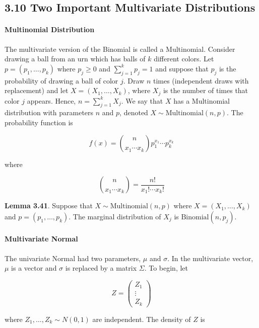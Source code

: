 \subsection*{3.10 Two Important Multivariate Distributions}\label{two-important-multivariate-distributions}

\paragraph{Multinomial Distribution}\label{multinomial-distribution}

The multivariate version of the Binomial is called a Multinomial.
Consider drawing a ball from an urn which has balls of \(k\) different
colors. Let \(p = (p_{1}, \dots, p_{k})\) where \(p_{j} \geq 0\) and
\(\sum_{j=1}^{k} p_{j} = 1\) and suppose that \(p_{j}\) is the probability of
drawing a ball of color \(j\). Draw \(n\) times (independent draws with
replacement) and let \(X = (X_{1}, \dots, X_{k})\), where \(X_{j}\) is the
number of times that color \(j\) appears. Hence,
\(n = \sum_{j=1}^{k} X_{j}\). We say that \(X\) has a Multinomial
distribution with parameters \(n\) and \(p\), denoted
\(X \sim \text{Multinomial}(n, p)\). The probability function is

\[ f(x) = \binom{n}{x_{1} \cdots x_{k}} p_{1}^{x_{1}} \cdots p_{k}^{x_{k}} \]

where

\[ \binom{n}{x_{1} \cdots x_{k}} = \frac{n!}{x_{1}! \cdots x_{k}!} \]

\textbf{Lemma 3.41}. Suppose that \(X \sim \text{Multinomial}(n, p)\)
where \(X = (X_{1}, \dots, X_{k})\) and \(p = (p_{1}, \dots, p_{k})\). The
marginal distribution of \(X_{j}\) is \(\text{Binomial}(n, p_{j})\).

\paragraph{Multivariate Normal}\label{rv:multivariate:normal}

The univariate Normal had two parameters, \(\mu\) and \(\sigma\). In the
multivariate vector, \(\mu\) is a vector and \(\sigma\) is replaced by a
matrix \(\Sigma\). To begin, let

\[ Z = \begin{pmatrix}
Z_{1} \\
\vdots \\
Z_{k}
\end{pmatrix}\]

where \(Z_{1}, \dots, Z_{k} \sim N(0, 1)\) are independent. The density of
\(Z\) is

